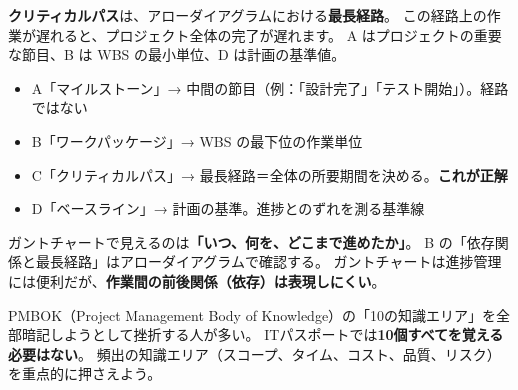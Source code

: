 \begin{kaisetsu}
\textbf{クリティカルパス}は、アローダイアグラムにおける\textbf{最長経路}。
この経路上の作業が遅れると、プロジェクト全体の完了が遅れます。
A はプロジェクトの重要な節目、B は WBS の最小単位、D は計画の基準値。
\end{kaisetsu}
\begin{goutoubun}
\begin{itemize}
  \item A「マイルストーン」→ 中間の節目（例：「設計完了」「テスト開始」）。経路ではない
  \item B「ワークパッケージ」→ WBS の最下位の作業単位
  \item C「クリティカルパス」→ 最長経路＝全体の所要期間を決める。\textbf{これが正解}
  \item D「ベースライン」→ 計画の基準。進捗とのずれを測る基準線
\end{itemize}
\end{goutoubun}

\begin{trickwarn}
ガントチャートで見えるのは\textbf{「いつ、何を、どこまで進めたか」}。
B の「依存関係と最長経路」はアローダイアグラムで確認する。
ガントチャートは進捗管理には便利だが、\textbf{作業間の前後関係（依存）は表現しにくい}。
\end{trickwarn}




\mondaipage
{}

\begin{stumble}
PMBOK（Project Management Body of Knowledge）の「10の知識エリア」を全部暗記しようとして挫折する人が多い。
ITパスポートでは\textbf{10個すべてを覚える必要はない}。
頻出の知識エリア（スコープ、タイム、コスト、品質、リスク）を重点的に押さえよう。
\end{stumble}

